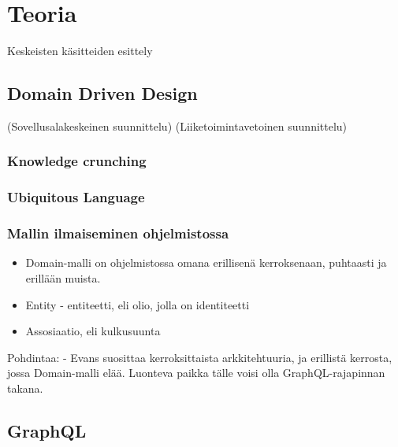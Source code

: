 \vspace{21.5pt}

\hypertarget{teoria}{%
\chapter{Teoria}\label{teoria}}

Keskeisten käsitteiden esittely

\hypertarget{domain-driven-design}{%
\section{Domain Driven Design}\label{domain-driven-design}}

(Sovellusalakeskeinen suunnittelu) (Liiketoimintavetoinen suunnittelu)

\hypertarget{knowledge-crunching}{%
\subsection{Knowledge crunching}\label{knowledge-crunching}}

\hypertarget{ubiquitous-language}{%
\subsection{Ubiquitous Language}\label{ubiquitous-language}}

\hypertarget{mallin-ilmaiseminen-ohjelmistossa}{%
\subsection{Mallin ilmaiseminen
ohjelmistossa}\label{mallin-ilmaiseminen-ohjelmistossa}}

\begin{itemize}
\tightlist
\item
  Domain-malli on ohjelmistossa omana erillisenä kerroksenaan, puhtaasti
  ja erillään muista.
\item
  Entity - entiteetti, eli olio, jolla on identiteetti
\item
  Assosiaatio, eli kulkusuunta
\end{itemize}

Pohdintaa: - Evans suosittaa kerroksittaista arkkitehtuuria, ja
erillistä kerrosta, jossa Domain-malli elää. Luonteva paikka tälle voisi
olla GraphQL-rajapinnan takana.

\hypertarget{graphql}{%
\section{GraphQL}\label{graphql}}

